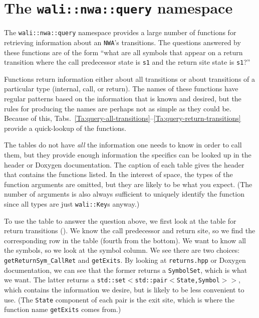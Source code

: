 \section{The \texttt{wali::nwa::query} namespace}
\label{Se:namespace-query}

The \texttt{wali::nwa::query} namespace provides a large number of functions
for retrieving information about an \texttt{NWA}'s transitions. The questions
answered by these functions are of the form ``what are all symbols that
appear on a return transition where the call predecessor state is \texttt{s1}
and the return site state is \texttt{s1}?''

Functions return information either about all transitions or about
transitions of a particular type (internal, call, or return). The names of
these functions have regular patterns based on the information that is
known and desired, but the rules for producing the names are perhaps not as
simple as they could be. Because of this,
Tabs.~\ref{Ta:query-all-transitions}--\ref{Ta:query-return-transitions}
provide a quick-lookup of the functions.

The tables do not have \textsl{all} the information one needs to know in
order to call them, but they provide enough information the specifics can be
looked up in the header or Doxygen documentation. The caption of each table
gives the header that contains the functions listed. In the interest of
space, the types of the function arguments are omitted, but they are likely to
be what you expect. (The number of arguments is also always sufficient to
uniquely identify the function since all types are just \texttt{wali::Key}s
anyway.)

To use the table to answer the question above, we first look at the table for
return transitions (). We know the call
predecessor and return site, so we find the corresponding row in the table
(fourth from the bottom). We want to know all the symbols, so we look at the
symbol column. We see there are two choices: \texttt{getReturnSym\_CallRet}
and \texttt{getExits}. By looking at \texttt{returns.hpp} or Doxygen
documentation, we can see that the former returns a \texttt{SymbolSet}, which
is what we want. The latter returns
a \texttt{std::set$<$std::pair$<$State,Symbol$>>$}, which contains the
information we desire, but is likely to be less convenient to
use. (The \texttt{State} component of each pair is the exit site, which is
where the function name \texttt{getExits} comes from.)





